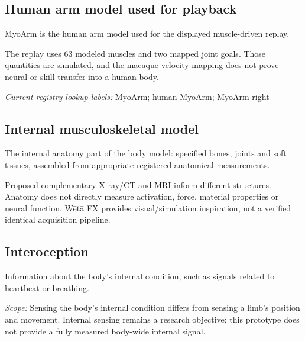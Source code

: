 \begin{samepage}
\subsection*{Human arm model used for playback}
\noindent MyoArm is the human arm model used for the displayed muscle-driven replay.\par
\end{samepage}
\begin{samepage}
\noindent The replay uses 63 modeled muscles and two mapped joint goals. Those quantities are simulated, and the macaque velocity mapping does not prove neural or skill transfer into a human body.\par\nopagebreak[4]

\end{samepage}


\noindent\textit{Current registry lookup labels:} MyoArm; human MyoArm; MyoArm right\par

\begin{samepage}
\subsection*{Internal musculoskeletal model}
\noindent The internal anatomy part of the body model: specified bones, joints and soft tissues, assembled from appropriate registered anatomical measurements.\par
\end{samepage}
\noindent Proposed complementary X-ray/CT and MRI inform different structures. Anatomy does not directly measure activation, force, material properties or neural function. Wētā FX provides visual/simulation inspiration, not a verified identical acquisition pipeline.\par

\begin{samepage}
\subsection*{Interoception}
\noindent Information about the body’s internal condition, such as signals related to heartbeat or breathing.\par
\end{samepage}
\begin{samepage}
\noindent\textit{Scope:} Sensing the body’s internal condition differs from sensing a limb’s position and movement. Internal sensing remains a research objective; this prototype does not provide a fully measured body-wide internal signal.\par\nopagebreak[4]

\end{samepage}


